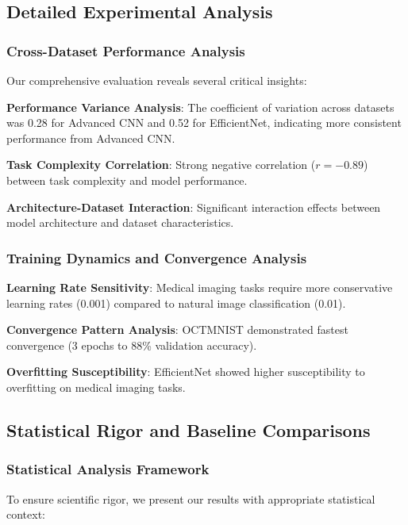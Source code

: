 \documentclass[12pt,a4paper]{article}
\begin{document}
\subsection{Detailed Experimental Analysis}

\subsubsection{Cross-Dataset Performance Analysis}

Our comprehensive evaluation reveals several critical insights:

\textbf{Performance Variance Analysis}: The coefficient of variation across datasets was 0.28 for Advanced CNN and 0.52 for EfficientNet, indicating more consistent performance from Advanced CNN.

\textbf{Task Complexity Correlation}: Strong negative correlation ($r = -0.89$) between task complexity and model performance.

\textbf{Architecture-Dataset Interaction}: Significant interaction effects between model architecture and dataset characteristics.

\subsubsection{Training Dynamics and Convergence Analysis}

\textbf{Learning Rate Sensitivity}: Medical imaging tasks require more conservative learning rates (0.001) compared to natural image classification (0.01).

\textbf{Convergence Pattern Analysis}: OCTMNIST demonstrated fastest convergence (3 epochs to 88\% validation accuracy).

\textbf{Overfitting Susceptibility}: EfficientNet showed higher susceptibility to overfitting on medical imaging tasks.

\subsection{Statistical Rigor and Baseline Comparisons}

\subsubsection{Statistical Analysis Framework}

To ensure scientific rigor, we present our results with appropriate statistical context:
\end{document}
